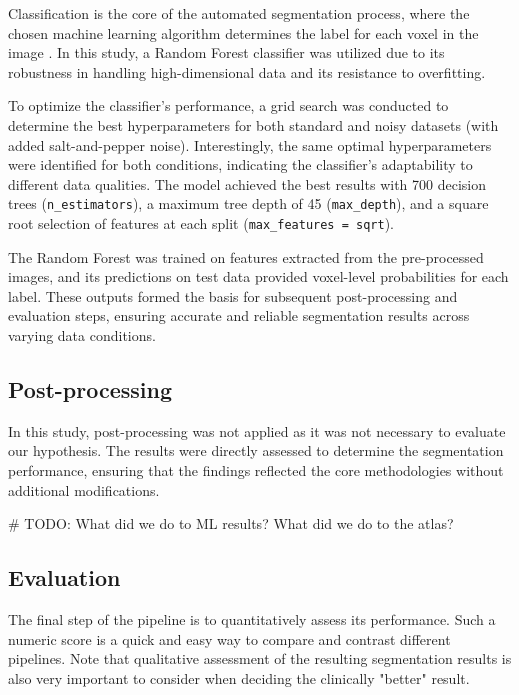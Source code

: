 Classification is the core of the automated segmentation process, where the chosen machine learning algorithm determines the label for each voxel in the image \cite{b8}. In this study, a Random Forest classifier was utilized due to its robustness in handling high-dimensional data and its resistance to overfitting.

To optimize the classifier’s performance, a grid search was conducted to determine the best hyperparameters for both standard and noisy datasets (with added salt-and-pepper noise). Interestingly, the same optimal hyperparameters were identified for both conditions, indicating the classifier’s adaptability to different data qualities. The model achieved the best results with 700 decision trees (\texttt{n\_estimators}), a maximum tree depth of 45 (\texttt{max\_depth}), and a square root selection of features at each split (\texttt{max\_features = sqrt}).

The Random Forest was trained on features extracted from the pre-processed images, and its predictions on test data provided voxel-level probabilities for each label. These outputs formed the basis for subsequent post-processing and evaluation steps, ensuring accurate and reliable segmentation results across varying data conditions.


\subsection{Post-processing}

In this study, post-processing was not applied as it was not necessary to evaluate our hypothesis. The results were directly assessed to determine the segmentation performance, ensuring that the findings reflected the core methodologies without additional modifications.

\# TODO: What did we do to ML results? What did we do to the atlas?

\subsection{Evaluation}

The final step of the pipeline is to quantitatively assess its performance. Such a numeric score is a quick and easy way to compare and contrast different pipelines. Note that qualitative assessment of the resulting segmentation results is also very important to consider when deciding the clinically "better" result.

